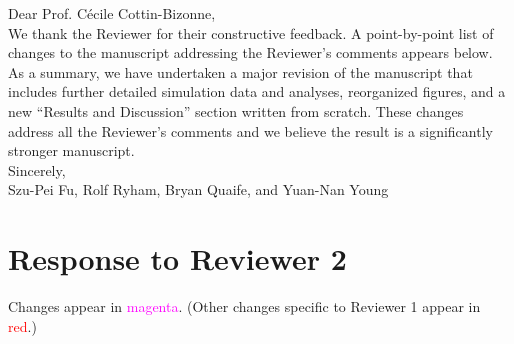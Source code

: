 \documentclass[11pt]{article}
\begin{document}
\noindent Dear Prof. C\'ecile Cottin-Bizonne,\\

\noindent 
We thank the Reviewer for their constructive feedback.
A point-by-point list of changes to the manuscript 
addressing the Reviewer's comments appears below.\\

\noindent As a summary, we have undertaken a major revision of the manuscript
that includes further detailed simulation data and analyses,
reorganized figures, and a new ``Results and Discussion'' section
written from scratch.  These changes address all the Reviewer's
comments and we believe the result is a
significantly stronger manuscript.\\


\noindent
Sincerely,
\\
\noindent
Szu-Pei Fu, Rolf Ryham, Bryan Quaife, and Yuan-Nan Young

\section*{Response to Reviewer 2}

\noindent Changes appear in \textcolor{magenta}{magenta}.
(Other changes specific to Reviewer 1 appear in \textcolor{red}{red}.)\\ \\
\end{document}

